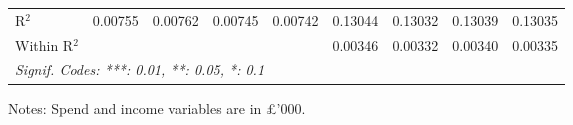 \begin{table}[htbp]
\begin{threeparttable}[b]
\begin{tabular}{lcccccccc}
         R$^2$                     & 0.00755         & 0.00762         & 0.00745         & 0.00742         & 0.13044         & 0.13032         & 0.13039         & 0.13035\\  
         Within R$^2$              &                 &                 &                 &                 & 0.00346         & 0.00332         & 0.00340         & 0.00335\\  
         \midrule \midrule
         \multicolumn{9}{l}{\emph{Signif. Codes: ***: 0.01, **: 0.05, *: 0.1}}\\
      \end{tabular}
      
      \begin{tablenotes}\footnotesize
         \item Notes: Spend and income variables are in \pounds'000.
      \end{tablenotes}
   \end{threeparttable}
\end{table}


